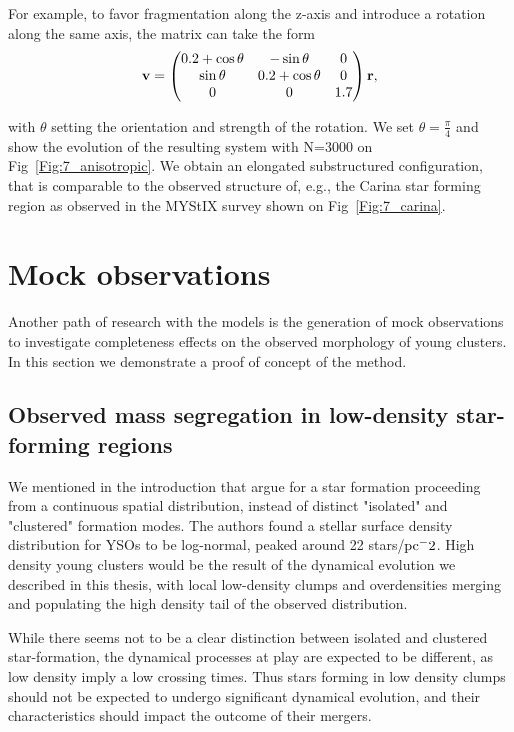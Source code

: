 For example, to favor fragmentation along the z-axis and introduce a rotation along the same axis, the matrix can take the form
\begin{equation}
\bold{v} = \left(\begin{matrix}
0.2 + \cos \theta &  -\sin \theta & 0\\
\sin \theta & 0.2 + \cos \theta & 0 \\
0  & 0 & 1.7\\
\end{matrix}\right) \bold{r},
\end{equation}

with $\theta$ setting the orientation and strength of the rotation. We set $\theta = \frac{\pi}{4}$ and show the evolution of the resulting system with N=3000 on Fig~\ref{Fig:7_anisotropic}. We obtain an elongated substructured configuration, that is comparable to the observed structure of, e.g., the Carina star forming region as observed in the MYStIX survey \citep{Kuhn2014} shown on Fig~\ref{Fig:7_carina}.



\section{Mock observations}

Another path of research with the \HubLem models is the generation of mock observations to investigate completeness effects on the observed morphology of young clusters. In this section we demonstrate a proof of concept of the method.

\subsection*{Observed mass segregation in low-density star-forming regions}

We mentioned in the introduction that \cite{Bressert2010} argue for a star formation proceeding from a continuous spatial distribution, instead of distinct "isolated" and "clustered" formation modes. The authors found a stellar surface density distribution for YSOs to be log-normal, peaked around 22 stars/${\textrm{pc}}^-2$.  High density young clusters would be the result of the dynamical evolution we described in this thesis, with local low-density clumps and overdensities merging and populating the high density tail of the observed distribution.

While there seems not to be a clear distinction between isolated and clustered star-formation, the dynamical processes at play are expected to be different, as low density imply a low crossing times. Thus stars forming in low density clumps should not be expected to undergo significant dynamical evolution, and their characteristics should impact the outcome of their mergers.

